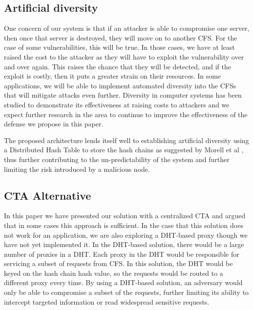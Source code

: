 \documentclass[a4paper,twoside]{article}
\begin{document}
\subsection{Artificial diversity}

One concern of our system is that if an attacker is able to compromise one server, then once that server is destroyed, they will move on to another CFS.  For the case of some vulnerabilities, this will be true.  In those cases, we have at least raised the cost to the attacker as they will have to exploit the vulnerability over and over again.  This raises the chance that they will be detected, and if the exploit is costly, then it puts a greater strain on their resources.  In some applications, we will be able to implement automated diversity into the CFSs that will mitigate attacks even further.  Diversity in computer systems \cite{forrest_building_1997, littlewood_redundancy_2004, cox_n-variant_2006} has been studied to demonstrate its effectiveness at raising costs to attackers and we expect further research in the area to continue to improve the effectiveness of the defense we propose in this paper.  

The proposed architecture lends itself well to establishing artificial diversity using a Distributed Hash Table to store the hash chains as suggested by Morell et al \cite{morrell_dht_2015}, thus further contributing to the un-predictability of the system and further limiting the risk introduced by a malicious node. 

\subsection{CTA Alternative}

In this paper we have presented our solution with a centralized CTA and argued that in some cases this approach is sufficient.  In the case that this solution does not work for an application, we are also exploring a DHT-based proxy though we have not yet implemented it.  In the DHT-based solution, there would be a large number of proxies in a DHT.  Each proxy in the DHT would be responsible for servicing a subset of requests from CFS.  In this solution, the DHT would be keyed on the hash chain hash value, so the requests would be routed to a different proxy every time.  By using a DHT-based solution, an adversary would only be able to compromise a subset of the requests, further limiting its ability to intercept targeted information or read widespread sensitive requests.  
\end{document}
